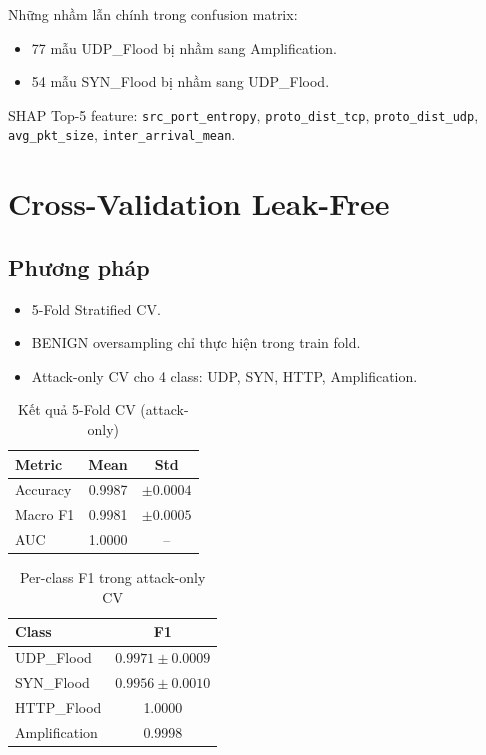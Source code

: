 \documentclass[12pt,a4paper]{article}
\begin{document}
Những nhầm lẫn chính trong confusion matrix:
\begin{itemize}[leftmargin=2em]
\item 77 mẫu UDP\_Flood bị nhầm sang Amplification.
\item 54 mẫu SYN\_Flood bị nhầm sang UDP\_Flood.
\end{itemize}

SHAP Top-5 feature: \texttt{src\_port\_entropy}, \texttt{proto\_dist\_tcp}, \texttt{proto\_dist\_udp}, \texttt{avg\_pkt\_size}, \texttt{inter\_arrival\_mean}.

\section{Cross-Validation Leak-Free}

\subsection{Phương pháp}
\begin{itemize}[leftmargin=2em]
\item 5-Fold Stratified CV.
\item BENIGN oversampling chỉ thực hiện trong train fold.
\item Attack-only CV cho 4 class: UDP, SYN, HTTP, Amplification.
\end{itemize}

\begin{table}[H]
\centering
\caption{Kết quả 5-Fold CV (attack-only)}
\begin{tabular}{lcc}
\toprule
\textbf{Metric} & \textbf{Mean} & \textbf{Std} \\
\midrule
Accuracy & 0.9987 & $\pm 0.0004$ \\
Macro F1 & 0.9981 & $\pm 0.0005$ \\
AUC & 1.0000 & -- \\
\bottomrule
\end{tabular}
\end{table}

\begin{table}[H]
\centering
\caption{Per-class F1 trong attack-only CV}
\begin{tabular}{lc}
\toprule
\textbf{Class} & \textbf{F1} \\
\midrule
UDP\_Flood & $0.9971 \pm 0.0009$ \\
SYN\_Flood & $0.9956 \pm 0.0010$ \\
HTTP\_Flood & 1.0000 \\
Amplification & 0.9998 \\
\bottomrule
\end{tabular}
\end{table}
\end{document}
